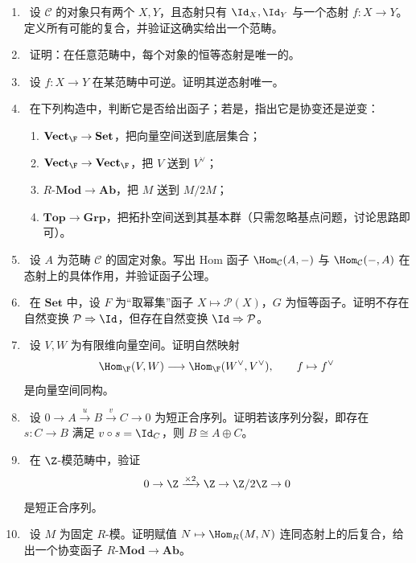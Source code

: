 \begin{enumerate}[label=\textbf{习题A.\arabic*}, leftmargin=3.5em]
  \item \basic\ 设 $\mathcal C$ 的对象只有两个 $X,Y$，且态射只有 $\Id_X,\Id_Y$ 与一个态射 $f\colon X\to Y$。定义所有可能的复合，并验证这确实给出一个范畴。

  \item \basic\ 证明：在任意范畴中，每个对象的恒等态射是唯一的。

  \item \basic\ 设 $f\colon X\to Y$ 在某范畴中可逆。证明其逆态射唯一。

  \item \basic\ 在下列构造中，判断它是否给出函子；若是，指出它是协变还是逆变：
  \begin{enumerate}[label=(\alph*), leftmargin=2.5em]
    \item $\mathbf{Vect}_{\F}\to \mathbf{Set}$，把向量空间送到底层集合；
    \item $\mathbf{Vect}_{\F}\to \mathbf{Vect}_{\F}$，把 $V$ 送到 $V^{\vee}$；
    \item $R\text{-}\mathbf{Mod}\to \mathbf{Ab}$，把 $M$ 送到 $M/2M$；
    \item $\mathbf{Top}\to \mathbf{Grp}$，把拓扑空间送到其基本群（只需忽略基点问题，讨论思路即可）。
  \end{enumerate}

  \item \basic\ 设 $A$ 为范畴 $\mathcal C$ 的固定对象。写出 Hom 函子 $\Hom_{\mathcal C}(A,-)$ 与 $\Hom_{\mathcal C}(-,A)$ 在态射上的具体作用，并验证函子公理。

  \item \basic\ 在 $\mathbf{Set}$ 中，设 $F$ 为“取幂集”函子 $X\mapsto \mathcal P(X)$，$G$ 为恒等函子。证明不存在自然变换 $\mathcal P\Rightarrow \Id$，但存在自然变换 $\Id\Rightarrow \mathcal P$。

  \item \basic\ 设 $V,W$ 为有限维向量空间。证明自然映射
  \[
    \Hom_{\F}(V,W)\longrightarrow \Hom_{\F}(W^{\vee},V^{\vee}),
    \qquad f\mapsto f^{\vee}
  \]
  是向量空间同构。

  \item \basic\ 设 $0\to A\xrightarrow{u}B\xrightarrow{v}C\to 0$ 为短正合序列。证明若该序列分裂，即存在 $s\colon C\to B$ 满足 $v\circ s=\Id_C$，则 $B\cong A\oplus C$。

  \item \basic\ 在 $\Z$-模范畴中，验证
  \[
    0\to \Z \xrightarrow{\times 2} \Z \to \Z/2\Z \to 0
  \]
  是短正合序列。

  \item \basic\ 设 $M$ 为固定 $R$-模。证明赋值 $N\mapsto \Hom_R(M,N)$ 连同态射上的后复合，给出一个协变函子 $R\text{-}\mathbf{Mod}\to \mathbf{Ab}$。
\end{enumerate}

